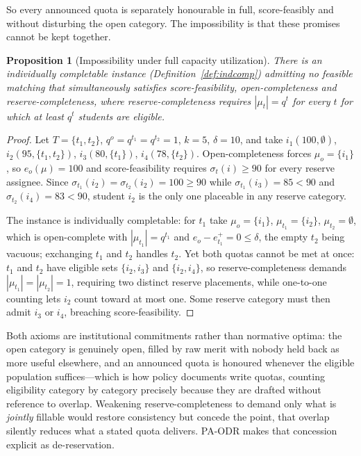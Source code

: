 \documentclass[a4paper,twoside]{article}
\newtheorem{proposition}{Proposition}
\theoremstyle{definition}
\begin{document}
So every announced quota is separately honourable in full, score-feasibly and without disturbing the open category. The impossibility is that these promises cannot be kept together.

\begin{proposition}[Impossibility under full capacity utilization]
\label{prop:impossibility}
There is an individually completable instance (Definition~\ref{def:indcomp}) admitting no feasible matching that simultaneously satisfies score-feasibility, \emph{open-completeness} and \emph{reserve-completeness}, where reserve-completeness requires $|\mu_t|=q^t$ for every $t$ for which at least $q^t$ students are eligible.
\end{proposition}

\begin{proof}
Let $T=\{t_1,t_2\}$, $q^o=q^{t_1}=q^{t_2}=1$, $k=5$, $\delta=10$, and take $i_1(100,\emptyset)$, $i_2(95,\{t_1,t_2\})$, $i_3(80,\{t_1\})$, $i_4(78,\{t_2\})$. Open-completeness forces $\mu_o=\{i_1\}$, so $e_o(\mu)=100$ and score-feasibility requires $\sigma_t(i)\ge90$ for every reserve assignee. Since $\sigma_{t_1}(i_2)=\sigma_{t_2}(i_2)=100\ge90$ while $\sigma_{t_1}(i_3)=85<90$ and $\sigma_{t_2}(i_4)=83<90$, student $i_2$ is the only one placeable in any reserve category.

The instance is individually completable: for $t_1$ take $\mu_o=\{i_1\}$, $\mu_{t_1}=\{i_2\}$, $\mu_{t_2}=\emptyset$, which is open-complete with $|\mu_{t_1}|=q^{t_1}$ and $e_o-e_{t_1}^+=0\le\delta$, the empty $t_2$ being vacuous; exchanging $t_1$ and $t_2$ handles $t_2$. Yet both quotas cannot be met at once: $t_1$ and $t_2$ have eligible sets $\{i_2,i_3\}$ and $\{i_2,i_4\}$, so reserve-completeness demands $|\mu_{t_1}|=|\mu_{t_2}|=1$, requiring two distinct reserve placements, while one-to-one counting lets $i_2$ count toward at most one. Some reserve category must then admit $i_3$ or $i_4$, breaching score-feasibility.
\end{proof}

Both axioms are institutional commitments rather than normative optima: the open category is genuinely open, filled by raw merit with nobody held back as more useful elsewhere, and an announced quota is honoured whenever the eligible population suffices---which is how policy documents write quotas, counting eligibility category by category precisely because they are drafted without reference to overlap. Weakening reserve-completeness to demand only what is \emph{jointly} fillable would restore consistency but concede the point, that overlap silently reduces what a stated quota delivers. PA-ODR makes that concession explicit as de-reservation.
\end{document}

